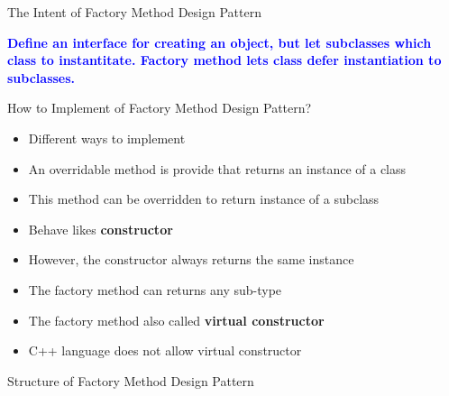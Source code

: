 \documentclass[13pt]{beamer}
\begin{document}
\begin{frame}{The Intent of Factory Method Design Pattern}
	\begin{center}
	\textcolor{blue}{\textbf{Define an interface for creating an object, but let subclasses which class to instantitate. Factory method lets class defer instantiation to subclasses.}}
	\end{center}
\end{frame}

\begin{frame}{How to Implement of Factory Method Design Pattern?}
	\begin{itemize}
		\setlength\itemsep{1em}
		\item Different ways to implement
		\item An overridable method is provide that returns an instance of a class
		\item This method can be overridden to return instance of a subclass
		\item Behave likes \textbf{constructor}
		\item However, the constructor always returns the same instance
		\item The factory method can returns any sub-type 
		\item The factory method also called \textbf{virtual constructor}
		\item C++ language does not allow virtual constructor
	\end{itemize}
\end{frame}

\begin{frame}{Structure of Factory Method Design Pattern}
	\begin{center}
	\end{center}
\end{frame}
\end{document}
